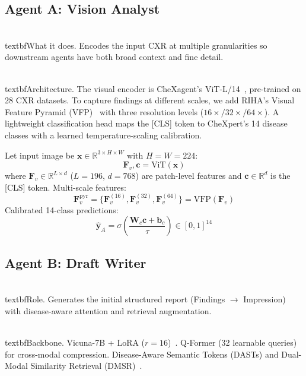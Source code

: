 \documentclass[runningheads,10pt]{llncs}
\newcommand{\Fv}{\mathbf{F}_v}
\newcommand{\yhat}{\hat{\mathbf{y}}}
\begin{document}
\subsection{Agent A: Vision Analyst}

\\textbf{What it does.} Encodes the input CXR at multiple granularities so downstream agents have both broad context and fine detail.

\\textbf{Architecture.} The visual encoder is CheXagent's ViT-L/14~\cite{chexagent}, pre-trained on 28 CXR datasets. To capture findings at different scales, we add RIHA's Visual Feature Pyramid (VFP)~\cite{riha} with three resolution levels ($16\times/32\times/64\times$). A lightweight classification head maps the [CLS] token to CheXpert's 14 disease classes with a learned temperature-scaling calibration.

Let input image be $\mathbf{x} \in \mathbb{R}^{3 \times H \times W}$ with $H=W=224$:
\begin{equation}
\Fv, \mathbf{c} = \text{ViT}(\mathbf{x}) \label{eq:vit}
\end{equation}
where $\Fv \in \mathbb{R}^{L \times d}$ ($L=196$, $d=768$) are patch-level features and $\mathbf{c} \in \mathbb{R}^{d}$ is the [CLS] token. Multi-scale features:
\begin{equation}
\Fv^{\text{pyr}} = \{ \Fv^{(16)}, \Fv^{(32)}, \Fv^{(64)} \} = \text{VFP}(\Fv) \label{eq:pyramid}
\end{equation}
Calibrated 14-class predictions:
\begin{equation}
\yhat_A = \sigma\!\left( \frac{\mathbf{W}_c \mathbf{c} + \mathbf{b}_c}{\tau} \right) \in [0, 1]^{14} \label{eq:classifier}
\end{equation}

\subsection{Agent B: Draft Writer}

\\textbf{Role.} Generates the initial structured report (Findings $\to$ Impression) with disease-aware attention and retrieval augmentation.

\\textbf{Backbone.} Vicuna-7B + LoRA ($r=16$)~\cite{radialog}. Q-Former (32 learnable queries)~\cite{chexagent} for cross-modal compression. Disease-Aware Semantic Tokens (DASTs) and Dual-Modal Similarity Retrieval (DMSR)~\cite{diseaseaware}.
\end{document}
